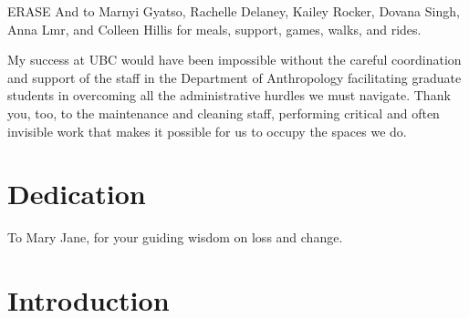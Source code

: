 \documentclass[
]{article}
\begin{document}
ERASE And to Marnyi Gyatso, Rachelle Delaney, Kailey Rocker, Dovana Singh, Anna Lmr, and Colleen Hillis for meals, support, games, walks, and rides.

My success at UBC would have been impossible without the careful coordination and support of the staff in the Department of Anthropology facilitating graduate students in overcoming all the administrative hurdles we must navigate. Thank you, too, to the maintenance and cleaning staff, performing critical and often invisible work that makes it possible for us to occupy the spaces we do.

\clearpage

\section*{Dedication}

\begin{center}
    \vspace*{\fill}
    To Mary Jane, for your guiding wisdom on loss and change.
    \vspace*{\fill}
\end{center}

\clearpage

\section{Introduction}\label{introduction}


\renewcommand{\thefigure}{1.\arabic{figure}}
\setcounter{figure}{0}
\renewcommand{\thetable}{1.\arabic{table}}
\setcounter{table}{0}
\renewcommand{\theequation}{1.\arabic{equation}}
\setcounter{equation}{0}
\end{document}
